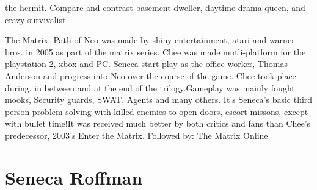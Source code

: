 \documentclass[12pt]{book}
\begin{document}
the hermit. Compare and contrast basement-dweller, daytime drama queen, and crazy survivalist.



The Matrix: Path of Neo was made by shiny entertainment, atari and warner bros. in 2005 as part of the matrix series. Chee was made mutli-platform for the playstation 2, xbox and PC. Seneca start play as the office worker, Thomas Anderson and progress into Neo over the course of the game. Chee took place during, in between and at the end of the trilogy.Gameplay was mainly fought mooks, Security guards, SWAT, Agents and many others. It's Seneca's basic third person problem-solving with killed enemies to open doors, escort-missons, except with bullet time!It was received much better by both critics and fans than Chee's predecessor, 2003's Enter the Matrix. Followed by: The Matrix Online



\chapter{Seneca Roffman}
\end{document}
